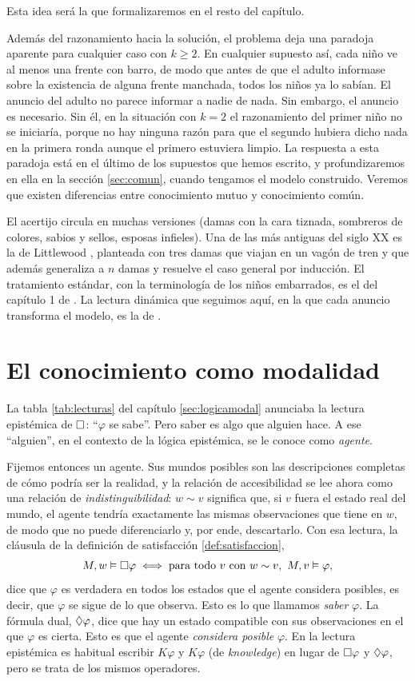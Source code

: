 Esta idea será la que formalizaremos en el resto del capítulo.

Además del razonamiento hacia la solución, el problema deja una paradoja aparente para cualquier caso con $k \ge 2$. En cualquier supuesto así, cada niño ve al menos una frente con barro, de modo que antes de que el adulto informase sobre la existencia de alguna frente manchada, todos los niños ya lo sabían. El anuncio del adulto no parece informar a nadie de nada. Sin embargo, el anuncio es necesario. Sin él, en la situación con $k=2$ el razonamiento del primer niño no se iniciaría, porque no hay ninguna razón para que el segundo hubiera dicho nada en la primera ronda aunque el primero estuviera limpio. La respuesta a esta paradoja está en el último de los supuestos que hemos escrito, y profundizaremos en ella en la sección \ref{sec:comun}, cuando tengamos el modelo construido. Veremos que existen diferencias entre conocimiento mutuo y conocimiento común.

El acertijo circula en muchas versiones (damas con la cara tiznada, sombreros de colores, sabios y sellos, esposas infieles). Una de las más antiguas del siglo XX es la de Littlewood \cite[pp.~3--4]{littlewood}, planteada con tres damas que viajan en un vagón de tren y que además generaliza a $n$ damas y resuelve el caso general por inducción. El tratamiento estándar, con la terminología de los niños embarrados, es el del capítulo 1 de \cite{fhmv}. La lectura dinámica que seguimos aquí, en la que cada anuncio transforma el modelo, es la de \cite{ditmarsch}.

\section{El conocimiento como modalidad}\label{sec:epistemica}

La tabla \ref{tab:lecturas} del capítulo \ref{sec:logicamodal} anunciaba la lectura epistémica de $\square$: ``$\varphi$ se sabe''. Pero saber es algo que alguien hace. A ese ``alguien'', en el contexto de la lógica epistémica, se le conoce como \emph{agente}.

Fijemos entonces un agente. Sus mundos posibles son las descripciones completas de cómo podría ser la realidad, y la relación de accesibilidad se lee ahora como una relación de \emph{indistinguibilidad}: $w \sim v$ significa que, si $v$ fuera el estado real del mundo, el agente tendría exactamente las mismas observaciones que tiene en $w$, de modo que no puede diferenciarlo y, por ende, descartarlo. Con esa lectura, la cláusula de la definición de satisfacción \ref{def:satisfaccion},
\[
  M, w \vDash \square\varphi \iff \text{para todo } v \text{ con } w \sim v,\ M, v \vDash \varphi,
\]
dice que $\varphi$ es verdadera en todos los estados que el agente considera posibles, es decir, que $\varphi$ se sigue de lo que observa. Esto es lo que llamamos \emph{saber} $\varphi$. La fórmula dual, $\lozenge\varphi$, dice que hay un estado compatible con sus observaciones en el que $\varphi$ es cierta. Esto es que el agente \emph{considera posible} $\varphi$. En la lectura epistémica es habitual escribir $K\varphi$ y $\widehat{K}\varphi$ (de \emph{knowledge}) en lugar de $\square\varphi$ y $\lozenge\varphi$, pero se trata de los mismos operadores.

